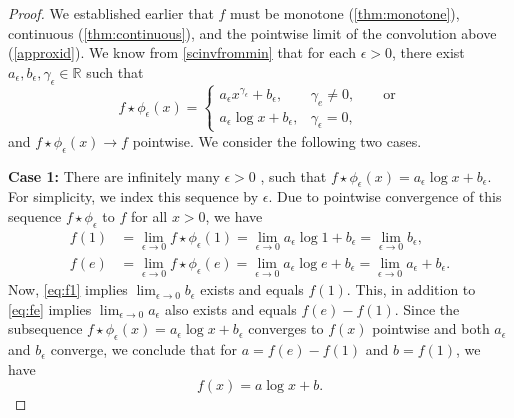 \documentclass[10pt,a4paper]{amsart}
\newcommand{\aep}{a_\e}
\newcommand{\be}{b_\e}
\newcommand{\e}{\epsilon}
\newcommand{\fpe}{f\star\phi_\e}
\begin{document}
\begin{proof}
  We established earlier that $f$ must be monotone
  (\cref{thm:monotone}), continuous (\cref{thm:continuous}), and
  the pointwise limit of the convolution above
  (\cref{approxid}).
  We know from \cref{scinvfrommin} that for each $\epsilon>0$, there exist
  $a_\e,b_\e,\gamma_\e\in\mathbb{R}$ such that
  \[
\fpe(x) =
\begin{cases}
  a_\e
  x^{\gamma_\e} +b_\e,& \gamma_e\neq 0, \qquad \mbox{or} \\
  a_\e\log x +b_\e, & \gamma_\e =0,
\end{cases}
\]
and $f\star\phi_\epsilon(x)\rightarrow f$ pointwise. We consider the
following two cases.


{\bf Case 1:} There are infinitely many $\e>0$ , such that
$\fpe(x) =a_\e \log x + b_\e$.
For simplicity, we index this sequence by $\e$. Due to pointwise
convergence of this sequence $\fpe$ to $f$ for all $x>0$, we have
\begin{align}
  f(1)& = \lim_{\e\rightarrow 0} \fpe(1) =  \lim_{\e\rightarrow 0} a_\e
  \log 1 +b_\e =  \lim_{\e\rightarrow 0} b_\epsilon, \label{eq:f1} \\
  f(e)& = \lim_{\e\rightarrow 0} \fpe(e) =  \lim_{\e\rightarrow 0} a_\e
  \log e +b_\e =  \lim_{\e\rightarrow 0}a_\e + b_\epsilon. \label{eq:fe}
\end{align}
 Now, \cref{eq:f1} implies $ \lim_{\e\rightarrow 0} b_\epsilon $ exists and equals
 $f(1)$. This, in addition to \cref{eq:fe} implies
 $\lim_{\e\rightarrow 0} a_\e $ also exists and equals $f(e)-f(1)$.
 Since the subsequence $\fpe(x) = \aep \log x +\be$ converges to
 $f(x)$ pointwise and both $\aep$ and $\be$ converge, we conclude that
 for $a = f(e)-f(1)$ and $b = f(1)$, we have
 \[f(x) = a\log x +b. \]


\end{proof}
\end{document}
